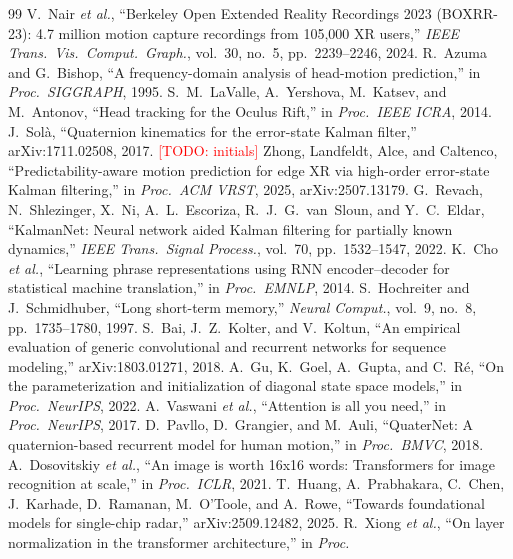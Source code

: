 \documentclass[conference]{IEEEtran}
\newcommand{\todo}[1]{\textcolor{red}{[TODO: #1]}}
\begin{document}
\begin{thebibliography}{99}\footnotesize
{} V.~Nair \emph{et al.}, ``Berkeley Open Extended Reality Recordings 2023 (BOXRR-23): 4.7 million
motion capture recordings from 105,000 XR users,'' \emph{IEEE Trans.\ Vis.\ Comput.\ Graph.}, vol.~30, no.~5,
pp.~2239--2246, 2024.
 R.~Azuma and G.~Bishop, ``A frequency-domain analysis of head-motion prediction,'' in \emph{Proc.\
SIGGRAPH}, 1995.
 S.~M.~LaValle, A.~Yershova, M.~Katsev, and M.~Antonov, ``Head tracking for the Oculus Rift,'' in
\emph{Proc.\ IEEE ICRA}, 2014.
 J.~Sol\`a, ``Quaternion kinematics for the error-state Kalman filter,'' arXiv:1711.02508, 2017.
\bibitem{zhong2025} \todo{initials} Zhong, Landfeldt, Alce, and Caltenco, ``Predictability-aware motion prediction for edge XR via high-order error-state Kalman
filtering,'' in \emph{Proc.\ ACM VRST}, 2025, arXiv:2507.13179.
 G.~Revach, N.~Shlezinger, X.~Ni, A.~L.~Escoriza, R.~J.~G.~van~Sloun, and Y.~C.~Eldar, ``KalmanNet:
Neural network aided Kalman filtering for partially known dynamics,'' \emph{IEEE Trans.\ Signal Process.}, vol.~70,
pp.~1532--1547, 2022.
 K.~Cho \emph{et al.}, ``Learning phrase representations using RNN encoder--decoder for statistical machine
translation,'' in \emph{Proc.\ EMNLP}, 2014.
 S.~Hochreiter and J.~Schmidhuber, ``Long short-term memory,'' \emph{Neural Comput.}, vol.~9,
no.~8, pp.~1735--1780, 1997.
 S.~Bai, J.~Z.~Kolter, and V.~Koltun, ``An empirical evaluation of generic convolutional and recurrent
networks for sequence modeling,'' arXiv:1803.01271, 2018.
 A.~Gu, K.~Goel, A.~Gupta, and C.~R\'e, ``On the parameterization and initialization of diagonal state
space models,'' in \emph{Proc.\ NeurIPS}, 2022.
 A.~Vaswani \emph{et al.}, ``Attention is all you need,'' in \emph{Proc.\ NeurIPS}, 2017.
\bibitem{pavllo2018} D.~Pavllo, D.~Grangier, and M.~Auli, ``QuaterNet: A quaternion-based recurrent model for human
motion,'' in \emph{Proc.\ BMVC}, 2018.
 A.~Dosovitskiy \emph{et al.}, ``An image is worth 16x16 words: Transformers for image recognition
at scale,'' in \emph{Proc.\ ICLR}, 2021.
 T.~Huang, A.~Prabhakara, C.~Chen, J.~Karhade, D.~Ramanan, M.~O'Toole, and A.~Rowe, ``Towards
foundational models for single-chip radar,'' arXiv:2509.12482, 2025.
\bibitem{xiong2020} R.~Xiong \emph{et al.}, ``On layer normalization in the transformer architecture,'' in \emph{Proc.\
}
\end{thebibliography}
\end{document}
